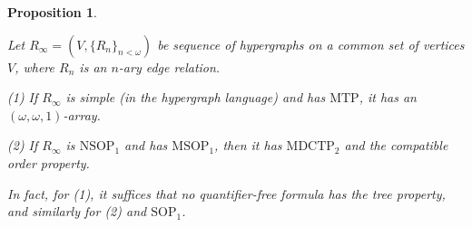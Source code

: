 \documentclass[12pt]{amsart}
\newtheorem{proposition}[theorem]{Proposition}
\theoremstyle{definition}
\begin{document}
\begin{proposition}\label{4-hyp}
    
Let $R_{\infty}=(V,\{R_{n}\}_{n < \omega})$ be sequence of hypergraphs on a common set of vertices $V$, where $R_{n}$ is an $n$-ary edge relation.

    (1) If $R_{\infty}$ is simple (in the hypergraph language) and has $\mathrm{MTP}$, it has an $(\omega, \omega, 1)$-array.
    
    (2) If $R_{\infty}$ is $\mathrm{NSOP}_{1}$ and has $\mathrm{MSOP}_{1}$, then it has $\mathrm{MDCTP}_{2}$ and the compatible order property. 

In fact, for (1), it suffices that no quantifier-free formula has the tree property, and similarly for (2) and $\mathrm{SOP}_{1}$.
\end{proposition}
\end{document}
